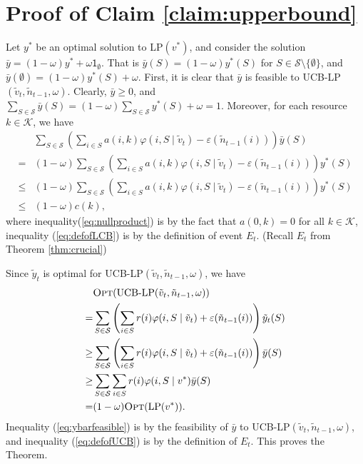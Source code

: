 \documentclass{article}
\theoremstyle{definition}
\newcommand{\KKK}{\mathcal{K}}
\newcommand{\SSS}{\mathcal{S}}
\begin{document}
\section{Proof of Claim \ref{claim:upperbound}}\label{app:pfclaimupperbound}
Let $y^*$ be an optimal solution to LP$(v^*)$, and consider the solution $\bar{y} = (1-\omega)y^* + \omega \mathsf{1}_{\emptyset}$. That is $\bar{y}(S) = (1-\omega)y^*(S)$ for $S\in\SSS\setminus \{\emptyset\}$, and $\bar{y}(\emptyset) = (1-\omega)y^*(S) + \omega$. First, it is clear that $\bar{y}$ is feasible to UCB-LP$(\tilde{v}_t, \tilde{n}_{t-1}, \omega)$. Clearly, $\bar{y} \geq 0$, and $\sum_{S\in\SSS}\bar{y}(S) = (1-\omega)\sum_{S\in\SSS}y^*(S) + \omega = 1.$ Moreover, for each resource $k\in \KKK$, we have 
\begin{align}
&\sum_{S\in \SSS} \left(\sum_{i\in S}a(i, k)\varphi(i, S\mid \tilde{v}_t) - \varepsilon(\tilde{n}_{t-1}(i))\right)\bar{y}(S) \nonumber\\
=&(1 - \omega)\sum_{S\in \SSS} \left(\sum_{i\in S}a(i, k)\varphi(i, S\mid \tilde{v}_t) - \varepsilon(\tilde{n}_{t-1}(i))\right)y^*(S)\label{eq:nullproduct}\\
\leq & (1 - \omega)\sum_{S\in \SSS} \left(\sum_{i\in S}a(i, k)\varphi(i, S\mid \tilde{v}_t) - \varepsilon(\tilde{n}_{t-1}(i))\right)y^*(S)  \label{eq:defofLCB}\\
\leq &(1-\omega)c(k) \nonumber,
\end{align}
where inequality(\ref{eq:nullproduct}) is by the fact that $a(0, k)=  0$ for all $k\in \KKK$, inequality (\ref{eq:defofLCB}) is by the definition of event $E_t$. (Recall $E_t$ from Theorem \ref{thm:crucial})

Since $\tilde{y}_t$ is optimal for UCB-LP$(\tilde{v}_t, \tilde{n}_{t-1}, \omega)$, we have
\begin{align}
&\text{{\sc Opt}}(\text{UCB-LP}(\tilde{v}_t, \tilde{n}_{t-1}, \omega)) \nonumber\\
=& \sum_{S\in \SSS} \left(\sum_{i\in S}r(i) \varphi (i, S\mid \tilde{v}_t) + \varepsilon(\tilde{n}_{t-1}(i))\right)\tilde{y}_t(S) \nonumber\\
\geq &\sum_{S\in \SSS} \left(\sum_{i\in S}r(i) \varphi (i, S\mid \tilde{v}_t) + \varepsilon(\tilde{n}_{t-1}(i))\right)\bar{y}(S)\label{eq:ybarfeasible}\\
\geq & \sum_{S\in \SSS} \sum_{i\in S}r(i) \varphi(i, S\mid v^*)\bar{y}(S) \label{eq:defofUCB}\\
= & (1-\omega) \text{{\sc Opt}}(\text{LP}(v^*))\nonumber.
\end{align}
Inequality (\ref{eq:ybarfeasible}) is by the feasibility of $\bar{y}$ to UCB-LP$(\tilde{v}_t, \tilde{n}_{t-1}, \omega)$, and inequality (\ref{eq:defofUCB}) is by the definition of $E_t$. This proves the Theorem.
\end{document}

